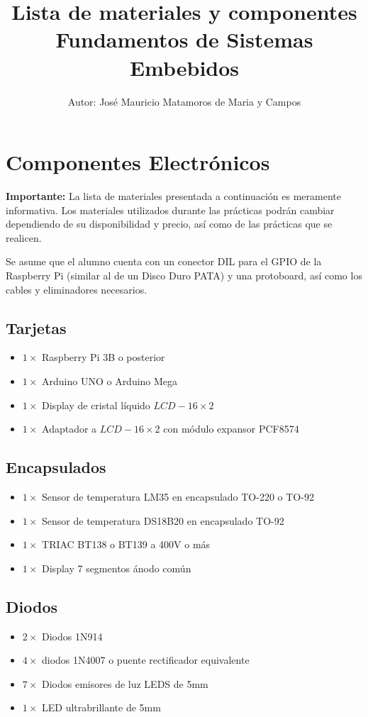 \documentclass[letterpaper,10.5pt]{article}
\author{\footnotesize Autor: José Mauricio Matamoros de Maria y Campos}
\title{Lista de materiales y componentes\\
{\large Fundamentos de Sistemas Embebidos}}
\date{}
\begin{document}
\maketitle

\section{Componentes Electrónicos}

\noindent
\textbf{Importante:} La lista de materiales presentada a continuación es meramente informativa.
Los materiales utilizados durante las prácticas podrán cambiar dependiendo de su disponibilidad y precio, así como de las prácticas que se realicen.

Se asume que el alumno cuenta con un conector DIL para el GPIO de la Raspberry Pi (similar al de un Disco Duro PATA) y una protoboard, así como los cables y eliminadores necesarios.

\subsection{Tarjetas}
\begin{itemize}[nosep]
	\item $1\times$ Raspberry Pi 3B o posterior
	\item $1\times$ Arduino UNO o Arduino Mega
	\item $1\times$ Display de cristal líquido $LCD-16\times2$
	\item $1\times$ Adaptador \IIC{} a $LCD-16\times2$ con módulo expansor PCF8574

\end{itemize}

\subsection{Encapsulados}
\begin{itemize}[nosep]
	\item $1\times$ Sensor de temperatura LM35 en encapsulado TO-220 o TO-92
	\item $1\times$ Sensor de temperatura DS18B20 en encapsulado TO-92
	\item $1\times$ TRIAC BT138 o BT139 a 400V o más
	\item $1\times$ Display 7 segmentos ánodo común
\end{itemize}

\subsection{Diodos}
\begin{itemize}[nosep]
	\item $2\times$ Diodos 1N914
	\item $4\times$ diodos 1N4007 o puente rectificador equivalente
	\item $7\times$ Diodos emisores de luz LEDS de 5mm
	\item $1\times$ LED ultrabrillante de 5mm
\end{itemize}
\end{document}
